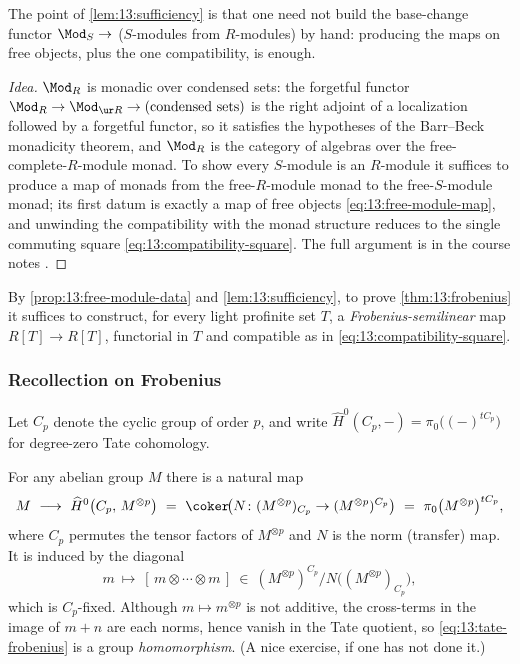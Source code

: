 The point of \cref{lem:13:sufficiency} is that one need not build the base-change
functor $\Mod_S\to$ ($S$-modules from $R$-modules) by hand: producing the maps on
free objects, plus the one compatibility, is enough.

\begin{proof}[Idea]
$\Mod_R$ is monadic over condensed sets: the forgetful functor
$\Mod_R\to\Mod_{\ur R}\to(\text{condensed sets})$ is the right adjoint of a
localization followed by a forgetful functor, so it satisfies the hypotheses of
the Barr--Beck monadicity theorem, and $\Mod_R$ is the category of algebras over
the free-complete-$R$-module monad. To show every $S$-module is an $R$-module it
suffices to produce a map of monads from the free-$R$-module monad to the
free-$S$-module monad; its first datum is exactly a map of free objects
\eqref{eq:13:free-module-map}, and unwinding the compatibility with the monad
structure reduces to the single commuting square
\eqref{eq:13:compatibility-square}. The full argument is in the course notes
\cite{clausen2020analytic}.
\end{proof}

By \cref{prop:13:free-module-data} and \cref{lem:13:sufficiency}, to prove
\cref{thm:13:frobenius} it suffices to construct, for every light profinite set
$T$, a \emph{Frobenius-semilinear} map $R[T]\to R[T]$, functorial in $T$ and
compatible as in \eqref{eq:13:compatibility-square}.

\subsubsection*{Recollection on Frobenius}

Let $C_p$ denote the cyclic group of order $p$, and write
$\widehat H^{0}(C_p,-)=\pi_0\big((-)^{tC_p}\big)$ for degree-zero Tate cohomology.

\begin{recollection}
\label{rec:13:frobenius}
For any abelian group $M$ there is a natural map
\begin{equation}
\label{eq:13:tate-frobenius}
M\ \longrightarrow\ \widehat H^{0}\big(C_p,\,M^{\otimes p}\big)\ =\ \coker\!\big(N\colon (M^{\otimes p})_{C_p}\to (M^{\otimes p})^{C_p}\big)\ =\ \pi_0\big(M^{\otimes p}\big)^{tC_p},
\end{equation}
where $C_p$ permutes the tensor factors of $M^{\otimes p}$ and $N$ is the norm
(transfer) map. It is induced by the diagonal
\begin{equation*}
m\ \longmapsto\ [\,m\otimes\cdots\otimes m\,]\ \in\ (M^{\otimes p})^{C_p}\big/N\big((M^{\otimes p})_{C_p}\big),
\end{equation*}
which is $C_p$-fixed. Although $m\mapsto m^{\otimes p}$ is not additive, the
cross-terms in the image of $m+n$ are each norms, hence vanish in the Tate
quotient, so \eqref{eq:13:tate-frobenius} is a group \emph{homomorphism}. (A nice
exercise, if one has not done it.)
\end{recollection}

